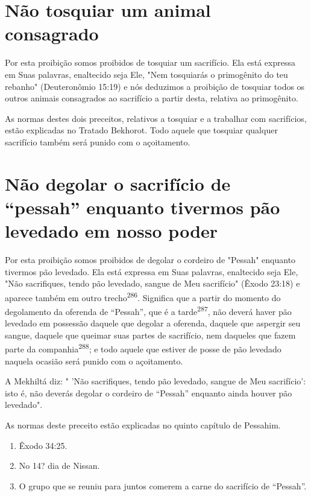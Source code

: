\section{Não tosquiar um animal consagrado}

Por esta proibição somos proibidos de tosquiar um sacrifício. Ela es­tá
expressa em Suas palavras, enaltecido seja Ele, "Nem tosquiarás o
primogê­nito do teu rebanho" (Deuteronômio 15:19) e nós deduzimos a
proibição de tosquiar todos os outros animais consagrados ao sacrifício
a partir desta, relati­va ao primogênito.

As normas destes dois preceitos, relativos a tosquiar e a trabalhar com
sacrifícios, estão explicadas no Tratado Bekhorot. Todo aquele que
tosquiar qualquer sacrifício também será punido com o açoitamento.

\section{Não degolar o sacrifício de ``pessah'' enquanto tivermos pão levedado em nosso poder}

Por esta proibição somos proibidos de degolar o cordeiro de "Pes­sah"
enquanto tivermos pão levedado. Ela está expressa em Suas palavras,
enal­tecido seja Ele, "Não sacrifiques, tendo pão levedado, sangue de
Meu sacrifí­cio" (Êxodo 23:18) e aparece também em outro
trecho\textsuperscript{286}. Significa que a par­tir do momento do
degolamento da oferenda de ``Pessah'', que é a tarde\textsuperscript{287},
não deverá haver pão levedado em possessão daquele que degolar a
oferenda, daquele que aspergir seu sangue, daquele que queimar suas
partes de sacrifício, nem daqueles que fazem parte da
companhia\textsuperscript{288}; e todo aquele que estiver de posse de
pão levedado naquela ocasião será punido com o açoitamento.

A Mekhiltá diz: " 'Não sacrifiques, tendo pão levedado, sangue de Meu
sacrifício': isto é, não deverás degolar o cordeiro de ``Pessah'' enquanto
ainda houver pão levedado".


As normas deste preceito estão explicadas no quinto capítulo de
Pessahim.

\begin{enumerate}
\def\labelenumi{\arabic{enumi}.}
\setcounter{enumi}{285}
\item
 
 Êxodo 34:25.
 
\item
 
 No 14? dia de Nissan.
 
\item
 
 O grupo que se reuniu para juntos comerem a carne do sacrifício de
 ``Pessah''.
 
\end{enumerate}



